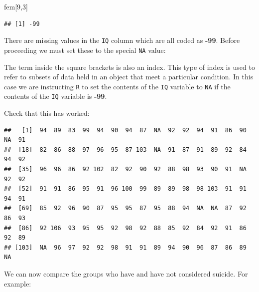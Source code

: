 \documentclass[12pt,]{book}
\newenvironment{Shaded}{\begin{snugshade}}{\end{snugshade}}
\newcommand{\DecValTok}[1]{\textcolor[rgb]{0.00,0.00,0.81}{#1}}
\newcommand{\StringTok}[1]{\textcolor[rgb]{0.31,0.60,0.02}{#1}}
\newcommand{\OtherTok}[1]{\textcolor[rgb]{0.56,0.35,0.01}{#1}}
\newcommand{\OperatorTok}[1]{\textcolor[rgb]{0.81,0.36,0.00}{\textbf{#1}}}
\newcommand{\NormalTok}[1]{#1}
\theoremstyle{definition}
\theoremstyle{definition}
\theoremstyle{definition}
\theoremstyle{remark}
\begin{document}
\begin{Shaded}
\begin{Highlighting}[]
\NormalTok{fem[}\DecValTok{9}\NormalTok{,}\DecValTok{3}\NormalTok{]}
\end{Highlighting}
\end{Shaded}

\begin{verbatim}
## [1] -99
\end{verbatim}

There are missing values in the \texttt{IQ} column which are all coded
as \textbf{-99}. Before proceeding we must set these to the special
\texttt{NA} value:

\begin{Shaded}
\end{Shaded}

The term inside the square brackets is also an index. This type of index
is used to refer to subsets of data held in an object that meet a
particular condition. In this case we are instructing \texttt{R} to set
the contents of the \texttt{IQ} variable to \texttt{NA} if the contents
of the \texttt{IQ} variable is \textbf{-99}.

Check that this has worked:

\begin{Shaded}
\end{Shaded}

\begin{verbatim}
##   [1]  94  89  83  99  94  90  94  87  NA  92  92  94  91  86  90  NA  91
##  [18]  82  86  88  97  96  95  87 103  NA  91  87  91  89  92  84  94  92
##  [35]  96  96  86  92 102  82  92  90  92  88  98  93  90  91  NA  92  92
##  [52]  91  91  86  95  91  96 100  99  89  89  98  98 103  91  91  94  91
##  [69]  85  92  96  90  87  95  95  87  95  88  94  NA  NA  87  92  86  93
##  [86]  92 106  93  95  95  92  98  92  88  85  92  84  92  91  86  92  89
## [103]  NA  96  97  92  92  98  91  91  89  94  90  96  87  86  89  NA
\end{verbatim}

We can now compare the groups who have and have not considered suicide.
For example:
\end{document}
